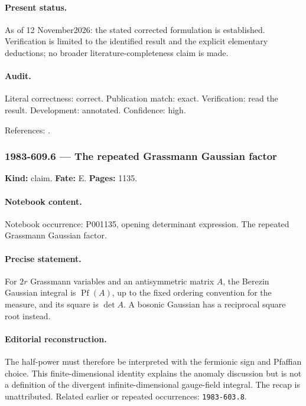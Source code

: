 \paragraph{Present status.} As of 12 November2026: the stated corrected formulation is established. Verification is limited to the identified result and the explicit elementary deductions; no broader literature-completeness claim is made.

\paragraph{Audit.} Literal correctness: correct. Publication match: exact. Verification: read the result. Development: annotated. Confidence: high.

\noindent References: \citep{witten1982anomaly,wangwenwitten2019new}.\par

\subsubsection{1983-609.6 --- The repeated Grassmann Gaussian factor}

\label{item:1983-609.6}

\noindent\textbf{Kind:} claim. \textbf{Fate:} E. \textbf{Pages:} 1135.\par

\paragraph{Notebook content.} Notebook occurrence: P001135, opening determinant expression. The repeated Grassmann Gaussian factor.

\paragraph{Precise statement.} For \(2r\) Grassmann variables and an antisymmetric matrix \(A\), the Berezin Gaussian integral is \(\operatorname{Pf}(A)\), up to the fixed ordering convention for the measure, and its square is \(\det A\). A bosonic Gaussian has a reciprocal square root instead.

\paragraph{Editorial reconstruction.} The half-power must therefore be interpreted with the fermionic sign and Pfaffian choice. This finite-dimensional identity explains the anomaly discussion but is not a definition of the divergent infinite-dimensional gauge-field integral. The recap is unattributed. Related earlier or repeated occurrences: \texttt{1983-603.8}.

